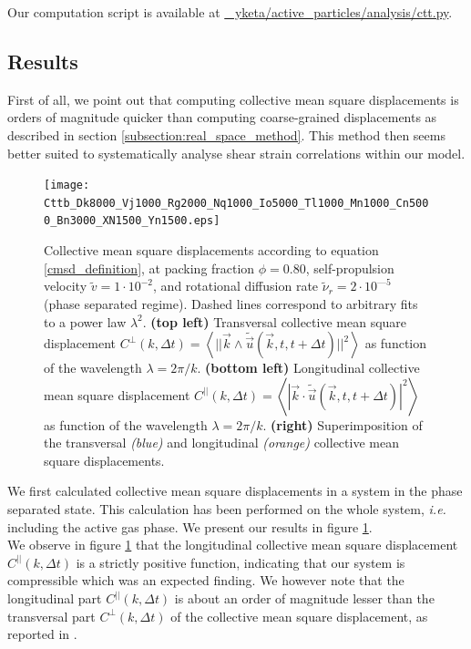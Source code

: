 \documentclass[class=report, float=false, crop=false]{standalone}
\begin{document}
Our computation script is available at \href{https://github.com/yketa/active_particles/blob/master/analysis/ctt.py}{{\faGithub~ yketa/active\_particles/analysis/ctt.py}}.

\subsection{Results}


First of all, we point out that computing collective mean square displacements is orders of magnitude quicker than computing coarse-grained displacements as described in section \ref{subsection:real_space_method}. This method then seems better suited to systematically analyse shear strain correlations within our model.

\begin{figure}[H]
\centering
\texttt{[image: Cttb\_Dk8000\_Vj1000\_Rg2000\_Nq1000\_Io5000\_Tl1000\_Mn1000\_Cn5000\_Bn3000\_XN1500\_Yn1500.eps]}
\vspace{-1cm}
\caption{Collective mean square displacements according to equation \ref{cmsd_definition}, at packing fraction $\phi = 0.80$, self-propulsion velocity $\tilde{v} = 1\cdot10^{-2}$, and rotational diffusion rate $\tilde{\nu}_r = 2\cdot10^{—5}$ (phase separated regime). Dashed lines correspond to arbitrary fits to a power law $\lambda^2$. \textbf{(top left)} Transversal collective mean square displacement $C^{\perp}(k, \Delta t) = \left<||\vec{k}\wedge\tilde{\vec{u}}(\vec{k}, t, t + \Delta t)||^2\right>$ as function of the wavelength $\lambda = 2\pi/k$. \textbf{(bottom left)} Longitudinal collective mean square displacement $C^{||}(k, \Delta t) = \left<|\vec{k}\cdot\tilde{\vec{u}}(\vec{k}, t, t + \Delta t)|^2\right>$ as function of the wavelength $\lambda = 2\pi/k$. \textbf{(right)} Superimposition of the transversal \textit{(blue)} and longitudinal \textit{(orange)} collective mean square displacements.}
\label{preliminary_cmsd}
\end{figure}

We first calculated collective mean square displacements in a system in the phase separated state. This calculation has been performed on the whole system, \textit{i.e.} including the active gas phase. We present our results in figure \ref{preliminary_cmsd}.\\

We observe in figure \ref{preliminary_cmsd} that the longitudinal collective mean square displacement $C^{||}(k, \Delta t)$ is a strictly positive function, indicating that our system is compressible \cite{illing2016strain} which was an expected finding. We however note that the longitudinal part $C^{||}(k, \Delta t)$ is about an order of magnitude lesser than the transversal part $C^{\perp}(k, \Delta t)$ of the collective mean square displacement, as reported in \cite{leonforte2005continuum}.\\
\end{document}
